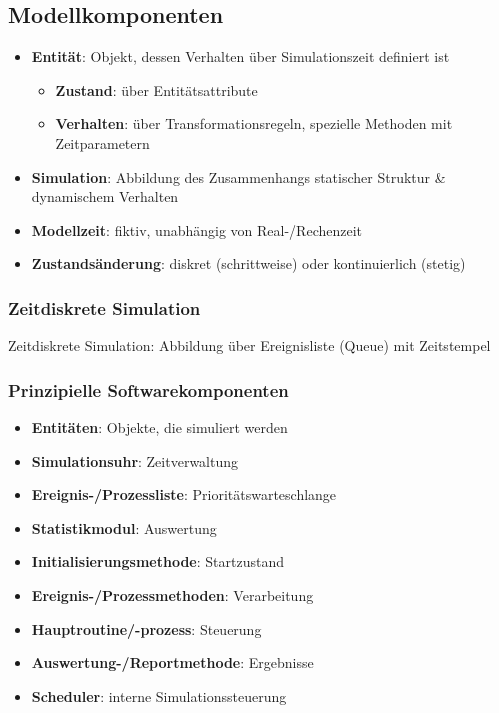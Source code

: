 \documentclass{article}
\begin{document}
\subsection{Modellkomponenten}
\begin{itemize}
  \item \textbf{Entität}: Objekt, dessen Verhalten über Simulationszeit definiert ist
        \begin{itemize}
          \item \textbf{Zustand}: über Entitätsattribute
          \item \textbf{Verhalten}: über Transformationsregeln, spezielle Methoden mit Zeitparametern
        \end{itemize}
  \item \textbf{Simulation}: Abbildung des Zusammenhangs statischer Struktur \& dynamischem Verhalten
  \item \textbf{Modellzeit}: fiktiv, unabhängig von Real-/Rechenzeit
  \item \textbf{Zustandsänderung}: diskret (schrittweise) oder kontinuierlich (stetig)
\end{itemize}

\subsubsection{Zeitdiskrete Simulation}
Zeitdiskrete Simulation: Abbildung über Ereignisliste (Queue) mit Zeitstempel


\subsubsection{Prinzipielle Softwarekomponenten}
\begin{itemize}
  \item \textbf{Entitäten}: Objekte, die simuliert werden
  \item \textbf{Simulationsuhr}: Zeitverwaltung
  \item \textbf{Ereignis-/Prozessliste}: Prioritätswarteschlange
  \item \textbf{Statistikmodul}: Auswertung
  \item \textbf{Initialisierungsmethode}: Startzustand
  \item \textbf{Ereignis-/Prozessmethoden}: Verarbeitung
  \item \textbf{Hauptroutine/-prozess}: Steuerung
  \item \textbf{Auswertung-/Reportmethode}: Ergebnisse
  \item \textbf{Scheduler}: interne Simulationssteuerung
\end{itemize}
\end{document}
